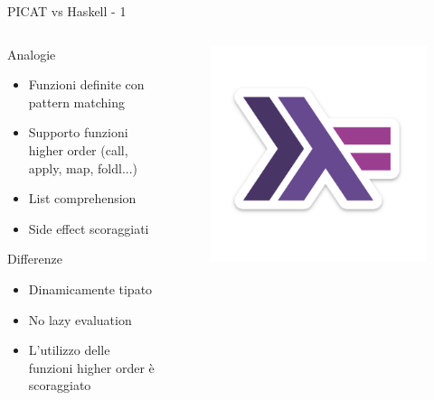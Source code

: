 \begin{frame}{PICAT vs Haskell - 1}
	
	\begin{columns}

		\begin{column}{1\textwidth}

			Analogie
			\begin{itemize}
				\item Funzioni definite con pattern matching
				\item Supporto funzioni higher order (call, apply, map, foldl...)
				\item List comprehension
				\item Side effect scoraggiati
			\end{itemize}

			Differenze
			\begin{itemize}
				\item Dinamicamente tipato
				\item No lazy evaluation
				\item L'utilizzo delle funzioni higher order è scoraggiato
			\end{itemize}

		\end{column}

		\begin{column}{0.1\textwidth}
			\begin{figure}
				\vspace*{-5cm}
				\hspace*{-2cm}
				\includegraphics[scale=0.1]{res/haskellLogo}
			\end{figure}
		\end{column}

	\end{columns}
	
\end{frame}

